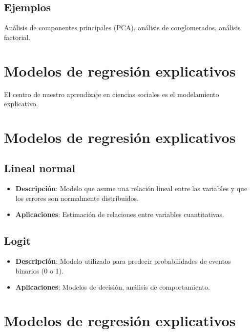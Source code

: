 \documentclass[
  letterpaper,
  DIV=11,
  numbers=noendperiod]{scrreprt}
\providecommand{\tightlist}{%
  \setlength{\itemsep}{0pt}\setlength{\parskip}{0pt}}\usepackage{longtable,booktabs,array}
\begin{document}
\subsection{Ejemplos}\label{ejemplos-1}

Análisis de componentes principales (PCA), análisis de conglomerados,
análisis factorial.

\section{Modelos de regresión
explicativos}\label{modelos-de-regresiuxf3n-explicativos}

El centro de nuestro aprendizaje en ciencias sociales es el modelamiento
explicativo.

\section{Modelos de regresión
explicativos}\label{modelos-de-regresiuxf3n-explicativos-1}

\subsection{Lineal normal}\label{lineal-normal}

\begin{itemize}
\tightlist
\item
  \textbf{Descripción}: Modelo que asume una relación lineal entre las
  variables y que los errores son normalmente distribuidos.
\item
  \textbf{Aplicaciones}: Estimación de relaciones entre variables
  cuantitativas.
\end{itemize}

\subsection{Logit}\label{logit}

\begin{itemize}
\tightlist
\item
  \textbf{Descripción}: Modelo utilizado para predecir probabilidades de
  eventos binarios (0 o 1).
\item
  \textbf{Aplicaciones}: Modelos de decisión, análisis de
  comportamiento.
\end{itemize}

\section{Modelos de regresión
explicativos}\label{modelos-de-regresiuxf3n-explicativos-2}
\end{document}
